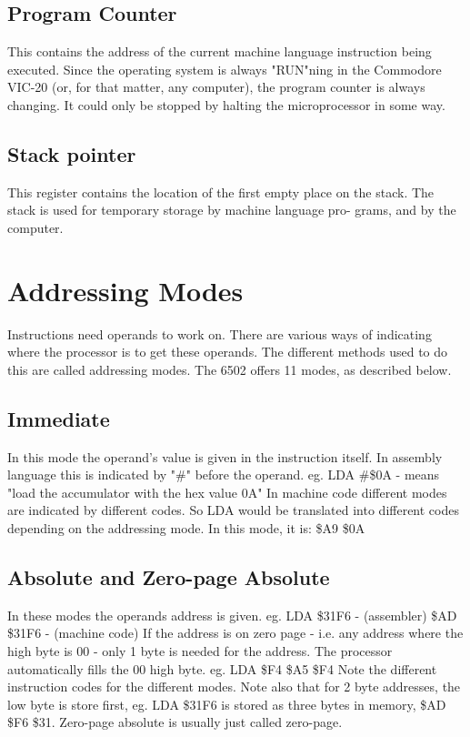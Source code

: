 \documentclass{article}
\begin{document}
  

  \subsection{Program Counter}

    This contains the address of the current machine language instruction
  being executed. Since the operating system is always "RUN"ning in the
  Commodore VIC-20 (or, for that matter, any computer), the program counter
  is always changing. It could only be stopped by halting the microprocessor
  in some way.


  \subsection{Stack pointer}

    This register contains the location of the first empty place on the
  stack. The stack is used for temporary storage by machine language pro-
  grams, and by the computer.




  \section{Addressing Modes}

   Instructions need operands to work on. There are various ways of
  indicating where the processor is to get these operands. The different
  methods used to do this are called addressing modes. The 6502 offers 11
  modes, as described below.
  \subsection{Immediate}
  In this mode the operand's value is given in the instruction itself. In
  assembly language this is indicated by "\#" before the operand.
  eg.  LDA \#\$0A - means "load the accumulator with the hex value 0A"
  In machine code different modes are indicated by different codes. So LDA
  would be translated into different codes depending on the addressing mode.
  In this mode, it is: \$A9 \$0A

  \subsection{Absolute and Zero-page Absolute}
  In these modes the operands address is given.
  eg.  LDA \$31F6 - (assembler)
       \$AD \$31F6 - (machine code)
  If the address is on zero page - i.e. any address where the high byte is
  00 - only 1 byte is needed for the address. The processor automatically
  fills the 00 high byte.
  eg.  LDA \$F4
       \$A5 \$F4
  Note the different instruction codes for the different modes.
  Note also that for 2 byte addresses, the low byte is store first, eg.
  LDA \$31F6 is stored as three bytes in memory, \$AD \$F6 \$31.
  Zero-page absolute is usually just called zero-page.
\end{document}
